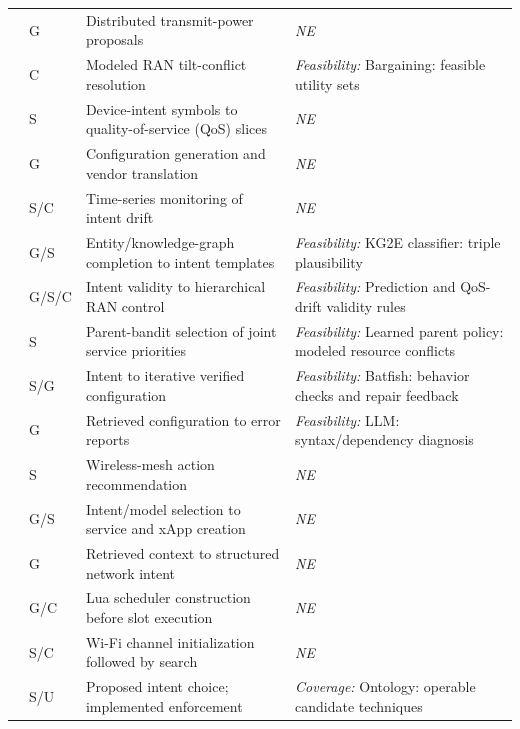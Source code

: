 \begin{longtable}{>{\raggedright\arraybackslash}p{.09\soklitwidth}>{\centering\arraybackslash}p{.07\soklitwidth}>{\raggedright\arraybackslash}p{.36\soklitwidth}>{\raggedright\arraybackslash}p{.48\soklitwidth}}
\addlinespace[1pt]
\cite{e0arxiv230702757} & G & Distributed transmit-power proposals & \textit{NE} \\
\addlinespace[1pt]
\cite{e0arxiv240108341} & C & Modeled RAN tilt-conflict resolution & \emph{Feasibility:} Bargaining: feasible utility sets \\
\addlinespace[1pt]
\cite{e0arxiv240202768} & S & Device-intent symbols to quality-of-service (QoS) slices & \textit{NE} \\
\addlinespace[1pt]
\cite{e0arxiv240309369} & G & Configuration generation and vendor translation & \textit{NE} \\
\addlinespace[1pt]
\cite{e0arxiv240415091} & S/C & Time-series monitoring of intent drift & \textit{NE} \\
\addlinespace[1pt]
\cite{e0arxiv240507850} & G/S & Entity/knowledge-graph completion to intent templates & \emph{Feasibility:} KG2E classifier: triple plausibility \\
\addlinespace[1pt]
\cite{e0arxiv240606059} & G/S/C & Intent validity to hierarchical RAN control & \emph{Feasibility:} Prediction and QoS-drift validity rules \\
\addlinespace[1pt]
\cite{e0arxiv240717767} & S & Parent-bandit selection of joint service priorities & \emph{Feasibility:} Learned parent policy: modeled resource conflicts \\
\addlinespace[1pt]
\cite{e0arxiv240813298} & S/G & Intent to iterative verified configuration & \emph{Feasibility:} Batfish: behavior checks and repair feedback \\
\addlinespace[1pt]
\cite{e0arxiv241114283} & G & Retrieved configuration to error reports & \emph{Feasibility:} LLM: syntax/dependency diagnosis \\
\addlinespace[1pt]
\cite{e0arxiv241116232} & S & Wireless-mesh action recommendation & \textit{NE} \\
\addlinespace[1pt]
\cite{e0arxiv250311933} & G/S & Intent/model selection to service and xApp creation & \textit{NE} \\
\addlinespace[1pt]
\cite{e0arxiv250509339} & G & Retrieved context to structured network intent & \textit{NE} \\
\addlinespace[1pt]
\cite{e0arxiv250518389} & G/C & Lua scheduler construction before slot execution & \textit{NE} \\
\addlinespace[1pt]
\cite{e0arxiv250604594} & S/C & Wi-Fi channel initialization followed by search & \textit{NE} \\
\addlinespace[1pt]
\cite{e0arxiv250712061} & S/U & Proposed intent choice; implemented enforcement & \emph{Coverage:} Ontology: operable candidate techniques \\

\end{longtable}
